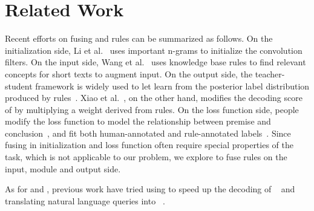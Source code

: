 \section{Related Work}

Recent efforts on fusing \NN and rules can be summarized as follows.
On the initialization side, Li et al.~ uses important n-grams to initialize the convolution filters. 
On the input side, Wang et al.~ uses knowledge base rules to find relevant concepts for short texts to augment input.
On the output side, the teacher-student framework is widely used to let \NN learn from the posterior label distribution produced by \FOL rules~\cite{hu2016harnessing,hu2016deep,guo2017knowledge}.
Xiao et al.~, on the other hand, modifies the decoding score of \NN by multiplying a weight derived from rules.
On the loss function side, people modify the loss function to model the relationship between premise and conclusion~\cite{demeester2016lifted}, and fit both human-annotated and rule-annotated labels~\cite{alashkar2017examples}.
Since fusing in initialization and loss function often require special properties of the task, which is not applicable to our problem, we explore to fuse \RE rules on the input, \NN module and output side.   

As for \NN and \RE, previous work have tried using \RE to speed up the decoding of \NN~\cite{strauss2016regular} and translating natural language queries into \REs~\cite{locascio2016neural}.

